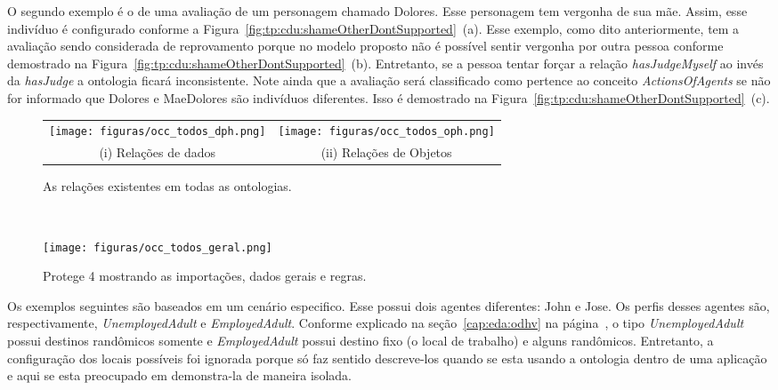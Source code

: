 O segundo exemplo é o de uma avaliação de um personagem chamado Dolores. Esse
personagem tem vergonha de sua mãe. Assim, esse indivíduo é configurado
conforme a Figura~\ref{fig:tp:cdu:shameOtherDontSupported}~(a).
Esse exemplo, como dito anteriormente, tem a avaliação sendo considerada de
reprovamento porque no modelo proposto não é possível sentir vergonha por
outra pessoa conforme demostrado na
Figura~\ref{fig:tp:cdu:shameOtherDontSupported}~(b). Entretanto, se a pessoa
tentar forçar a relação \emph{hasJudgeMyself} ao invés da \emph{hasJudge} a
ontologia ficará inconsistente. Note ainda que a avaliação será classificado
como pertence ao conceito \emph{ActionsOfAgents} se não for informado que
Dolores e MaeDolores são indivíduos diferentes. Isso é demostrado na
Figura~\ref{fig:tp:cdu:shameOtherDontSupported}~(c).

\begin{figure}[ht]
    \centering
	\begin{minipage}[t]{\linewidth}
		\centering
	    \begin{tabular}{cc}
		\texttt{[image: figuras/occ\_todos\_dph.png]} \hspace{1cm} & \texttt{[image: figuras/occ\_todos\_oph.png]} \\
	    (i) Relações de dados & (ii) Relações de Objetos
	    \end{tabular}
		\caption{As relações existentes em todas as ontologias.}
		\label{fig:tp:cdu:relations}
	\end{minipage} \vspace{0.3cm} \\
	\begin{minipage}[b]{\linewidth}
		\centering
		\texttt{[image: figuras/occ\_todos\_geral.png]}
		\caption{Protege 4 mostrando as importações, dados gerais e regras.}
		\label{fig:tp:cdu:geral}
	\end{minipage}
\end{figure}

Os exemplos seguintes são baseados em um cenário especifico. Esse possui
dois agentes diferentes: John e Jose. Os perfis desses agentes
são, respectivamente, \emph{UnemployedAdult} e \emph{EmployedAdult}.
Conforme explicado na seção~\ref{cap:eda:odhv} na página~\pageref{ex:tipos},
o tipo \emph{UnemployedAdult} possui destinos randômicos somente e
\emph{EmployedAdult} possui destino fixo (o local de trabalho) e alguns
randômicos. Entretanto, a configuração dos locais possíveis foi ignorada
porque só faz sentido descreve-los quando se esta usando a ontologia
dentro de uma aplicação e aqui se esta preocupado em demonstra-la de maneira
isolada.

